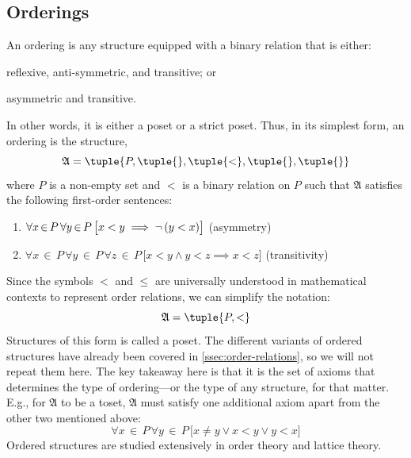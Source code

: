\subsection{Orderings}
An ordering is any structure equipped with a binary relation that is either:
\begin{enumerate*}[label=(\roman*)]
    \item reflexive, anti-symmetric, and transitive; or
    \item asymmetric and transitive.
\end{enumerate*}
In other words, it is either a poset or a strict poset. Thus, in its simplest
form, an ordering is the structure,
\begin{equation*}
    \mathfrak{A} = \tuple{P, \tuple{  }, \tuple{<}, \tuple{  }, \tuple{  }}
\end{equation*}
where \( P \) is a non-empty set and \( < \) is a binary relation on \( P \) such that \( \mathfrak{A} \)
satisfies the following first-order sentences:
\begin{enumerate}[topsep=2pt,label=\textup{\texttt{(\alph*)}}]
    \item \( \forall x\,{\in}\,P \, \forall y\,{\in}\,P \, \big[ x < y \implies \lnot \, \mleft( y < x \mright) \big] \) (asymmetry)
    \item \( \forall x\,{\in}\,P \, \forall y\,{\in}\,P \, \forall z\,{\in}\,P \, \big[ x < y \land y < z \implies x < z \big] \) (transitivity)
\end{enumerate}
Since the symbols \( < \) and \( \leq \) are universally understood in mathematical contexts to represent order relations, we can simplify the notation:
\begin{equation*}
    \mathfrak{A} = \tuple{P, <}
\end{equation*}
Structures of this form is called a poset. The different variants of ordered structures have already been covered in \cref{ssec:order-relations}, so we will not repeat
them here. The key takeaway here is that it is the set of axioms that determines the type of ordering---or the type of any structure, for that matter.
E.g., for \( \mathfrak{A} \) to be a toset, \( \mathfrak{A} \) must satisfy one additional axiom apart from the other two mentioned above:
\begin{equation*}
    \forall x\,{\in}\,P \, \forall y\,{\in}\,P \, \big[ x \neq y \lor x < y \lor y < x \big]
\end{equation*}
Ordered structures are studied extensively in order theory and lattice theory.


